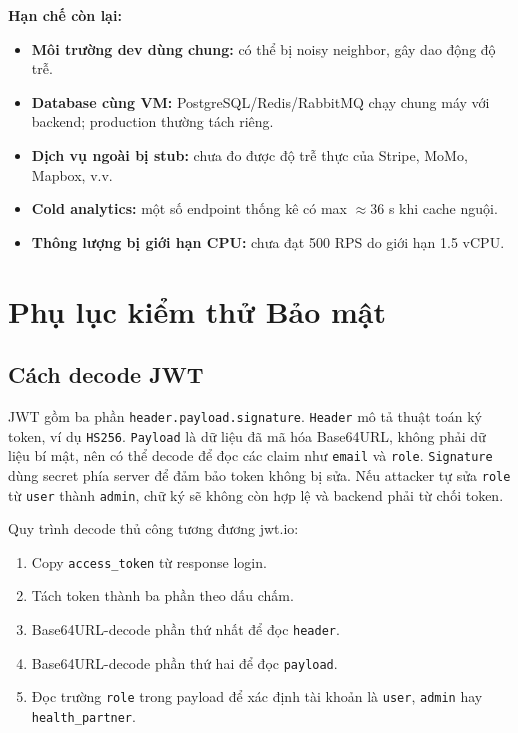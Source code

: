 \noindent\textbf{Hạn chế còn lại:}
\begin{itemize}
    \item \textbf{Môi trường dev dùng chung:} có thể bị noisy neighbor, gây dao động độ trễ.
    \item \textbf{Database cùng VM:} PostgreSQL/Redis/RabbitMQ chạy chung máy với backend; production thường tách riêng.
    \item \textbf{Dịch vụ ngoài bị stub:} chưa đo được độ trễ thực của Stripe, MoMo, Mapbox, v.v.
    \item \textbf{Cold analytics:} một số endpoint thống kê có max $\approx$36 s khi cache nguội.
    \item \textbf{Thông lượng bị giới hạn CPU:} chưa đạt 500 RPS do giới hạn 1.5 vCPU.
\end{itemize}

\chapter{Phụ lục kiểm thử Bảo mật}
\section{Cách decode JWT}
JWT gồm ba phần \texttt{header.payload.signature}. \texttt{Header} mô tả thuật toán ký token, ví dụ \texttt{HS256}. \texttt{Payload} là dữ liệu đã mã hóa Base64URL, không phải dữ liệu bí mật, nên có thể decode để đọc các claim như \texttt{email} và \texttt{role}. \texttt{Signature} dùng secret phía server để đảm bảo token không bị sửa. Nếu attacker tự sửa \texttt{role} từ \texttt{user} thành \texttt{admin}, chữ ký sẽ không còn hợp lệ và backend phải từ chối token.

Quy trình decode thủ công tương đương jwt.io:
\begin{enumerate}
    \item Copy \texttt{access\_token} từ response login.
    \item Tách token thành ba phần theo dấu chấm.
    \item Base64URL-decode phần thứ nhất để đọc \texttt{header}.
    \item Base64URL-decode phần thứ hai để đọc \texttt{payload}.
    \item Đọc trường \texttt{role} trong payload để xác định tài khoản là \texttt{user}, \texttt{admin} hay \texttt{health\_partner}.
\end{enumerate}


